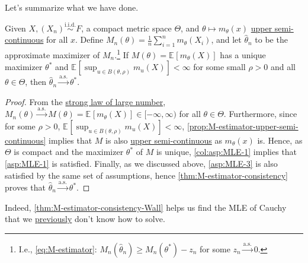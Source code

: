 Let's summarize what we have done.

\begin{theorem}[Wall]\label{thm:M-estimator-consistency-Wall}
	Given \(X, (X_n) \overset{\text{i.i.d.} }{\sim } F\), a compact metric space \(\Theta \), and \(\theta \mapsto m_\theta (x)\) \hyperref[def:upper-semi-continuous]{upper semi-continuous} for all \(x\). Define \(M_n (\theta ) = \frac{1}{n}\sum_{i=1}^{n} m_\theta (X_i)\), and let \(\hat{\theta} _n\) to be the approximate maximizer of \(M_n\).\footnote{I.e., \autoref{eq:M-estimator}: \(M_n(\hat{\theta} _n) \geq M_n(\theta ^{\ast} ) - z_n\) for some \(z_n \overset{\text{a.s.} }{\to} 0\).} If \(M(\theta ) = \mathbb{E}_{}[m_\theta (X)] \) has a unique maximizer \(\theta ^{\ast} \) and \(\mathbb{E}_{}[\sup _{u \in B(\theta , \rho )} m_u (X) ] < \infty\) for some small \(\rho > 0\) and all \(\theta \in \Theta \), then \(\hat{\theta} _n \overset{\text{a.s.} }{\to} \theta ^{\ast} \).
\end{theorem}
\begin{proof}
	From the \hyperref[thm:SLLN]{strong law of large number}, \(M_n(\theta ) \overset{\text{a.s.} }{\to} M(\theta ) = \mathbb{E}_{}[m_\theta (X) ] \in [-\infty , \infty )\) for all \(\theta \in \Theta \). Furthermore, since for some \(\rho > 0\), \(\mathbb{E}_{}[\sup _{u \in B(\theta , \rho )} m_u(X)] < \infty \), \autoref{prop:M-estimator-upper-semi-continuous} implies that \(M\) is also \hyperref[def:upper-semi-continuous]{upper semi-continuous} as \(m_\theta (x)\) is. Hence, as \(\Theta \) is compact and the maximizer \(\theta ^{\ast} \) of \(M\) is unique, \autoref{col:asp:MLE-1} implies that \autoref{asp:MLE-1} is satisfied. Finally, as we discussed above, \autoref{asp:MLE-3} is also satisfied by the same set of assumptions, hence \autoref{thm:M-estimator-consistency} proves that \(\hat{\theta} _n \overset{\text{a.s.} }{\to} \theta ^{\ast} \).
\end{proof}

Indeed, \autoref{thm:M-estimator-consistency-Wall} helps us find the MLE of Cauchy that we \hyperref[eg:MLE-Cauchy]{previously} don't know how to solve.

